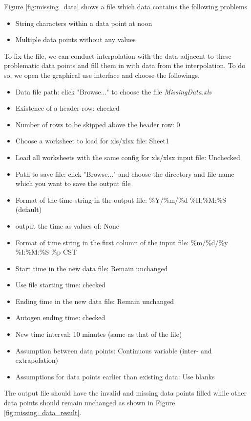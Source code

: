 \documentclass[12pt,a4paper]{article}
\begin{document}
Figure \ref{fig:missing_data} shows a file which data contains the following problems
\begin{itemize}
\item String characters within a data point at noon
\item Multiple data points without any values
\end{itemize}

To fix the file, we can conduct interpolation with the data adjacent to these problematic data points and fill them in with data from the interpolation.
To do so, we open the graphical use interface and choose the followings.
\begin{itemize}
\item Data file path: click "Browse..." to choose the file \emph{MissingData.xls}
\item Existence of a header row: checked
\item Number of rows to be skipped above the header row: 0
\item Choose a worksheet to load for xls/xlsx file: Sheet1
\item Load all worksheets with the same config for xls/xlsx input file: Unchecked
\item Path to save file: click "Browse..." and choose the directory and file name which you want to save the output file
\item Format of the time string in the output file: \%Y/\%m/\%d \%H:\%M:\%S (default)
\item output the time as values of: None
\item Format of time string in the first column of the input file: \%m/\%d/\%y \%I:\%M:\%S \%p CST
\item Start time in the new data file: Remain unchanged
\item Use file starting time: checked
\item Ending time in the new data file: Remain unchanged
\item Autogen ending time: checked
\item New time interval: 10 minutes (same as that of the file)
\item Assumption between data points: Continuous variable (inter- and extrapolation)
\item Assumptions for data points earlier than existing data: Use blanks
\end{itemize}

The output file should have the invalid and missing data points filled while other data points should remain unchanged as shown in Figure \ref{fig:missing_data_result}.
\end{document}
